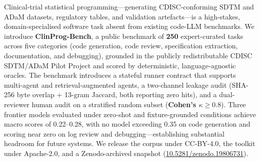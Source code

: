 Clinical-trial statistical programming---generating CDISC-conforming SDTM and ADaM
datasets, regulatory tables, and validation artefacts---is a high-stakes,
domain-specialised software task absent from existing code-LLM benchmarks. We
introduce \textbf{ClinProg-Bench}, a public benchmark of \textbf{250} expert-curated
tasks across five categories (code generation, code review, specification
extraction, documentation, and debugging), grounded in the publicly redistributable
CDISC SDTM/ADaM Pilot Project and scored by deterministic, language-agnostic
oracles. The benchmark introduces a stateful runner contract that supports
multi-agent and retrieval-augmented agents, a two-channel leakage audit
(SHA-256 byte overlap + 13-gram Jaccard, both reporting zero hits), and a
dual-reviewer human audit on a stratified random subset (\textbf{Cohen's $\kappa
\geq 0.8$}). Three frontier models evaluated under zero-shot and
fixture-grounded conditions achieve macro scores of 0.22--0.28, with no model
exceeding 0.35 on code generation and scoring near zero on log review and
debugging---establishing substantial headroom for future systems. We release
the corpus under CC-BY-4.0, the toolkit under Apache-2.0, and a Zenodo-archived
snapshot (\href{https://doi.org/10.5281/zenodo.19806731}{10.5281/zenodo.19806731}).
